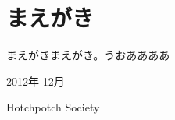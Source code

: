 
\chapter*{まえがき}
\thispagestyle{fronthead}

まえがきまえがき。うおああああ

\begin{flushright}
 2012年 12月

Hotchpotch Society
\end{flushright}
